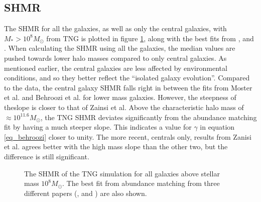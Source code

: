 
\subsection{SHMR}
The SHMR for all the galaxies, as well as only the central galaxies, with $M_{*} > 10^8 M_{\odot}$ from TNG is plotted in figure \ref{shmr_res}, along with the best fits from \cite{Moster2012}, \cite{Behroozi2013} and \cite{Zanisi2019}.
When calculating the SHMR using all the galaxies, the median values are pushed towards lower halo masses compared to only central galaxies. As mentioned earlier, the central galaxies are less affected by environmental conditions, and so they better reflect the ``isolated galaxy evolution''. Compared to the data, the central galaxy SHMR falls right in between the fits from Moster et al. and Behroozi et al. for lower mass galaxies. However, the steepness of theslope is closer to that of Zainsi et al. Above the characteristic halo mass of $\approx 10^{11.6} M_{\odot}$, the TNG SHMR deviates significantly from the abundance matching fit by having a much steeper slope. This indicates a value for $\gamma$ in equation \ref{eq_behroozi} closer to unity. The more recent, centrals only, results from Zanisi et al. agrees better with the high mass slope than the other two, but the difference is still significant.


\begin{figure}
    \centering
    \caption{The SHMR of the TNG simulation for all galaxies above stellar mass $10^8 M_{\odot}$. The best fit from abundance matching from three different papers (\cite{Moster2012}, \cite{Behroozi2013} and \cite{Zanisi2019}) are also shown.} 
    \label{shmr_res}
\end{figure}


